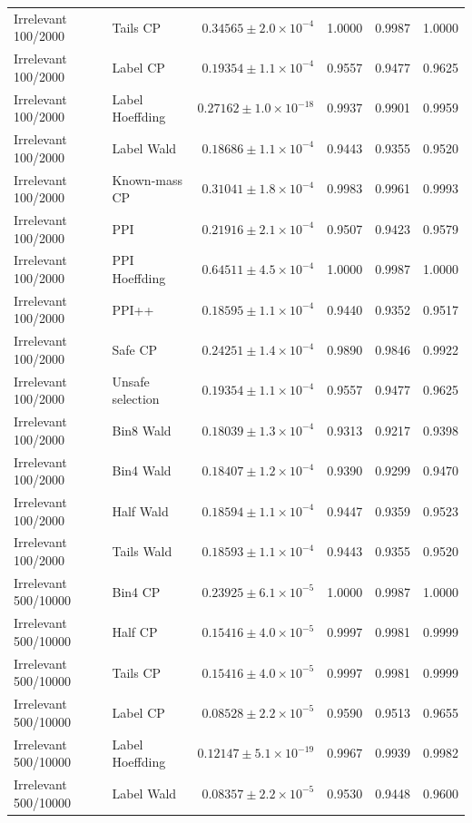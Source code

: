 \begin{longtable}{llrrrr}
Irrelevant 100/2000 & Tails CP & $0.34565\pm 2.0\times 10^{-4}$ & 1.0000 & 0.9987 & 1.0000 \\
Irrelevant 100/2000 & Label CP & $0.19354\pm 1.1\times 10^{-4}$ & 0.9557 & 0.9477 & 0.9625 \\
Irrelevant 100/2000 & Label Hoeffding & $0.27162\pm 1.0\times 10^{-18}$ & 0.9937 & 0.9901 & 0.9959 \\
Irrelevant 100/2000 & Label Wald & $0.18686\pm 1.1\times 10^{-4}$ & 0.9443 & 0.9355 & 0.9520 \\
Irrelevant 100/2000 & Known-mass CP & $0.31041\pm 1.8\times 10^{-4}$ & 0.9983 & 0.9961 & 0.9993 \\
Irrelevant 100/2000 & PPI & $0.21916\pm 2.1\times 10^{-4}$ & 0.9507 & 0.9423 & 0.9579 \\
Irrelevant 100/2000 & PPI Hoeffding & $0.64511\pm 4.5\times 10^{-4}$ & 1.0000 & 0.9987 & 1.0000 \\
Irrelevant 100/2000 & PPI++ & $0.18595\pm 1.1\times 10^{-4}$ & 0.9440 & 0.9352 & 0.9517 \\
Irrelevant 100/2000 & Safe CP & $0.24251\pm 1.4\times 10^{-4}$ & 0.9890 & 0.9846 & 0.9922 \\
Irrelevant 100/2000 & Unsafe selection & $0.19354\pm 1.1\times 10^{-4}$ & 0.9557 & 0.9477 & 0.9625 \\
Irrelevant 100/2000 & Bin8 Wald & $0.18039\pm 1.3\times 10^{-4}$ & 0.9313 & 0.9217 & 0.9398 \\
Irrelevant 100/2000 & Bin4 Wald & $0.18407\pm 1.2\times 10^{-4}$ & 0.9390 & 0.9299 & 0.9470 \\
Irrelevant 100/2000 & Half Wald & $0.18594\pm 1.1\times 10^{-4}$ & 0.9447 & 0.9359 & 0.9523 \\
Irrelevant 100/2000 & Tails Wald & $0.18593\pm 1.1\times 10^{-4}$ & 0.9443 & 0.9355 & 0.9520 \\
Irrelevant 500/10000 & Bin4 CP & $0.23925\pm 6.1\times 10^{-5}$ & 1.0000 & 0.9987 & 1.0000 \\
Irrelevant 500/10000 & Half CP & $0.15416\pm 4.0\times 10^{-5}$ & 0.9997 & 0.9981 & 0.9999 \\
Irrelevant 500/10000 & Tails CP & $0.15416\pm 4.0\times 10^{-5}$ & 0.9997 & 0.9981 & 0.9999 \\
Irrelevant 500/10000 & Label CP & $0.08528\pm 2.2\times 10^{-5}$ & 0.9590 & 0.9513 & 0.9655 \\
Irrelevant 500/10000 & Label Hoeffding & $0.12147\pm 5.1\times 10^{-19}$ & 0.9967 & 0.9939 & 0.9982 \\
Irrelevant 500/10000 & Label Wald & $0.08357\pm 2.2\times 10^{-5}$ & 0.9530 & 0.9448 & 0.9600 \\

\end{longtable}
